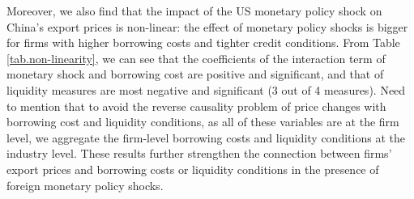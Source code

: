 Moreover, we also find that the impact of the US monetary policy shock on China's export prices is non-linear: the effect of monetary policy shocks is bigger for firms with higher borrowing costs and tighter credit conditions. From Table \ref{tab.non-linearity}, we can see that the coefficients of the interaction term of monetary shock and borrowing cost are positive and significant, and that of liquidity measures are most negative and significant (3 out of 4 measures). Need to mention that to avoid the reverse causality problem of price changes with borrowing cost and liquidity conditions, as all of these variables are at the firm level, we aggregate the firm-level borrowing costs and liquidity conditions at the industry level. These results further strengthen the connection between firms' export prices and borrowing costs or liquidity conditions in the presence of foreign monetary policy shocks.

